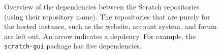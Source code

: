 \documentclass[../main]{subfiles}
\begin{document}
\footnotetext{}

\begin{figure}
    \begin{wide}
        
    \end{wide}
    \caption{
        Overview of the dependencies between the Scratch repositories (using their repository name).
        The repositories that are purely for the hosted instance, such as the website, account system, and forum are left out.
        An arrow indicates a depdency.
        For example, the \texttt{scratch-gui} package has five dependencies.
    }
    \label{fig:scratch-dependencies}
\end{figure}
\end{document}
